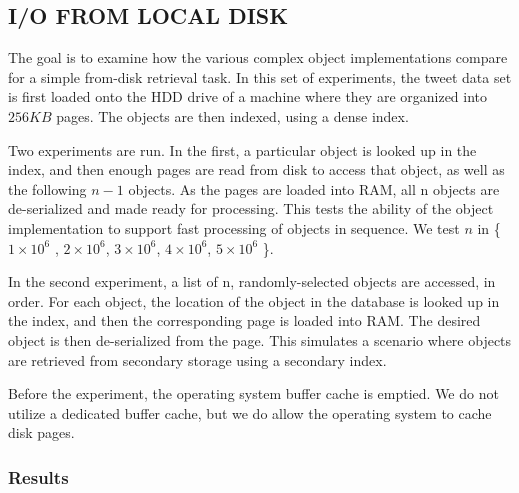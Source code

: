 \subsection{I/O FROM LOCAL DISK}
 The goal is to examine how the various complex object implementations compare for a simple from-disk retrieval task. In this set of experiments, the tweet data set is first loaded onto the HDD drive of a machine where they are organized into $256KB$ pages. The objects are then indexed, using a dense index.

Two experiments are run. In the first, a particular object is looked up in the index, and then enough pages are read from disk to access that object, as well as the following $n − 1$ objects. As the pages are loaded into RAM, all n objects are de-serialized and made ready for processing. This tests the ability of the object implementation to support fast processing of objects in sequence. We test $n$ in \{  $1\times 10^6$ , $2\times10^6$, $3\times10^6$, $4\times10^6$, $5\times10^6$ \}.

In the second experiment, a list of n, randomly-selected objects are accessed, in order. For each object, the location of the object in the database is looked up in the index, and then the corresponding page is loaded into RAM. The desired object is then de-serialized from the page. This simulates a scenario where objects are retrieved from secondary storage using a secondary index.

Before the experiment, the operating system buffer cache is emptied. We do not utilize a dedicated buffer cache, but we do allow the operating system to cache disk pages.

\subsubsection{Results}

